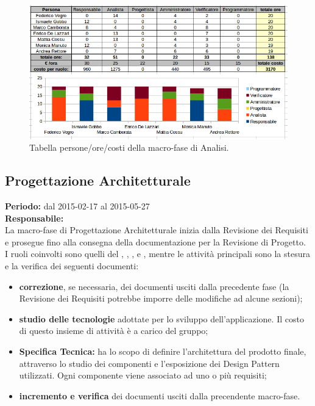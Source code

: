 \begin{figure}[h]
\begin{center}
\includegraphics[width=\textwidth, height=\textheight, keepaspectratio]{img/analisi-personeorecosti.png}
\caption{Tabella persone/ore/costi della macro-fase di Analisi.}
\end{center}
\end{figure}

\newpage
\subsection{Progettazione Architetturale}
\textbf{Periodo:} dal 2015-02-17 al 2015-05-27 \\
\textbf{Responsabile:} \GoIs \\
La macro-fase di Progettazione Architetturale inizia dalla Revisione dei Requisiti e prosegue fino alla consegna della documentazione per la Revisione di Progetto. \\
I ruoli coinvolti sono quelli del \ruoloResponsabile{}, \ruoloAmministratore{}, \ruoloAnalista{}, \ruoloProgettista{} e \ruoloVerificatore{}, mentre le attività principali sono la stesura e la verifica dei seguenti documenti:

\begin{itemize}
\item \textbf{correzione}, se necessaria, dei documenti usciti dalla precedente fase (la Revisione dei Requisiti potrebbe imporre delle modifiche ad alcune sezioni);
\item \textbf{studio delle tecnologie} adottate per lo sviluppo dell'applicazione. Il costo di questo insieme di attività è a carico del gruppo; 
\item \textbf{Specifica Tecnica:} ha lo scopo di definire l'architettura del prodotto finale,  attraverso lo studio dei componenti e l'esposizione dei Design Pattern utilizzati. Ogni componente viene associato ad uno o più requisiti;
\item \textbf{incremento e verifica} dei documenti usciti dalla precendente macro-fase.
\end{itemize}

